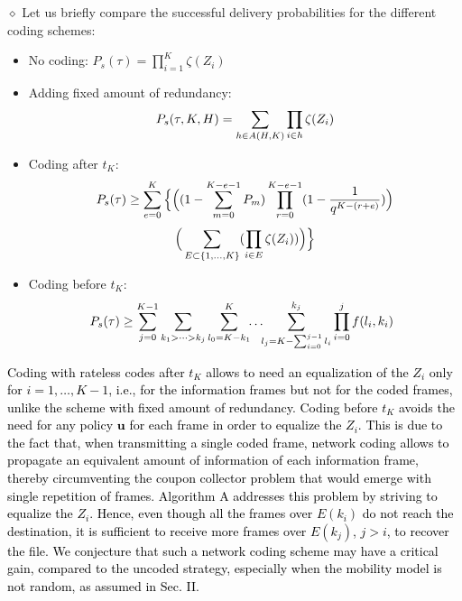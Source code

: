 \documentclass[10pt,twocolumn,conference,final]{IEEEtran}
\def\endpf{\hfill$\diamond$}
\begin{document}
\endpf
Let us briefly compare the successful delivery probabilities for the different coding schemes:
\begin{itemize}
\item No coding:
\(P_s(\tau)=\prod_{i=1}^K\zeta(Z_i)\)
\item Adding fixed amount of redundancy:\\[-4mm]
\[P_s ( \tau,K,H ) = \sum_{ h \in A(H,K) } \prod_{i\in h} \zeta (Z_i)\\[-4mm]\]
\item Coding after $t_K$:\\[-4mm]
\[
P_s(\tau)\geq\sum_{e=0}^K \Big\{ \Big((1-\sum_{m=0}^{K-e-1}P_m)\prod_{r=0}^{K-e-1}(1-\frac{1}{q^{K-(r+e)}})\Big)\\[-4mm]
\]
\[
\Big( \sum_{E\subset\{1,\dots,K\}}(\prod_{i\in E}\zeta(Z_i))\Big)\Big\}\\[-3mm]
\]
\item Coding before $t_K$: \\[-4mm]\[
\!\!\!P_s(\tau)\geq \sum_{j=0}^{K-1}\sum_{k_1>\dots>k_j}\sum_{l_0=K-k_1}^{K}\!\!\ldots\!\!\sum_{l_{j}=K-\sum_{i=0}^{j-1} l_i}^{k_j}
\prod_{i=0}^j f(l_i,k_i)\,\\[-1mm]\]
\end{itemize}
\textcolor{black}{Coding with rateless codes after $t_K$ allows to need an equalization of the $Z_i$ only for $i=1,\dots,K-1$, i.e., for the information frames but not for the coded frames, unlike the scheme with fixed amount of redundancy. Coding before $t_K$ avoids the need for any policy $\mathbf{u}$ for each frame in order to equalize the $Z_i$. This is due to the fact that, when transmitting a single coded frame, network coding allows to propagate an equivalent amount of information of each information frame, thereby circumventing the coupon collector problem that would emerge with single repetition of frames. Algorithm A addresses this problem by striving to equalize the $Z_i$. }
\textcolor{black}{Hence, even though all the frames over $E(k_i)$ do not reach the destination, it is sufficient to receive more frames over $E(k_j)$, $j>i$, to recover the file. We conjecture that such a network coding scheme may have a critical gain, compared to the uncoded strategy, especially when the mobility model is not random, as assumed in Sec. II.}
\end{document}
